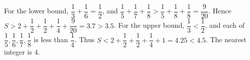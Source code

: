 For the lower bound, $\dfrac{1}{3}+\dfrac{1}{6}=\dfrac{1}{2}$, and $\dfrac{1}{5}+\dfrac{1}{7}+\dfrac{1}{8}>\dfrac{1}{5}+\dfrac{1}{8}+\dfrac{1}{8}=\dfrac{9}{20}$. Hence $S>2+\dfrac{1}{2}+\dfrac{1}{2}+\dfrac{1}{4}+\dfrac{9}{20}=3.7>3.5$. For the upper bound, $\dfrac{1}{3}<\dfrac{1}{2}$, and each of $\dfrac{1}{5},\dfrac{1}{6},\dfrac{1}{7},\dfrac{1}{8}$ is less than $\dfrac{1}{4}$. Thus $S<2+\dfrac{1}{2}+\dfrac{1}{2}+\dfrac{1}{4}+1=4.25<4.5$. The nearest integer is $\boxed 4$.
